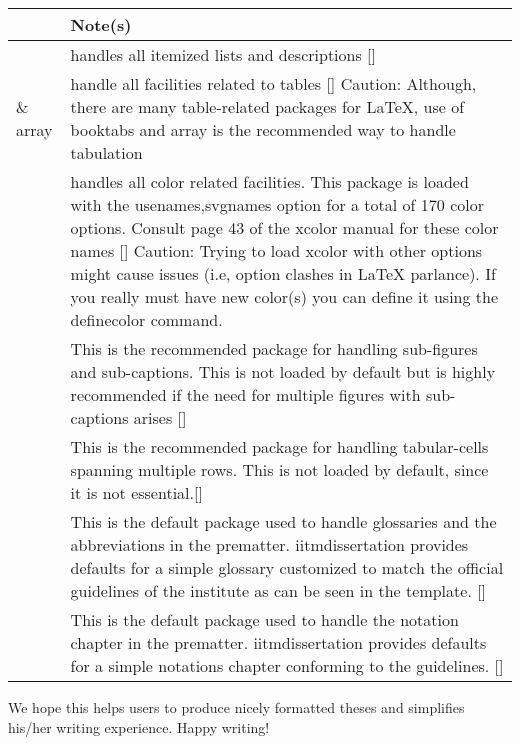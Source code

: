 \begin{table}
\centering
\begin{tabular}{>{\ttfamily}l p{}}
\toprule
{\rmfamily Package(s)} & Note(s) \\
\midrule
{enumitem}
    &
handles all itemized lists and descriptions
[\cite{enumitem}] \\

{booktabs} \& {array}
    &
handle all facilities related to tables [\cite{booktabs,array}]
\newline
{Caution: } Although, there are many table-related packages for {\LaTeX},
use of {booktabs} and {array} is the recommended way to handle
tabulation \\

{xcolor}
    &
handles all color related facilities. This package is loaded with the
{usenames,svgnames} option for a total of 170 color options. Consult page
43 of the {xcolor} manual for these color names [\cite{xcolor}]
\newline
{Caution: } Trying to load {xcolor} with other options might cause
issues (i.e, option clashes in {\LaTeX} parlance). If you really must have new
color(s) you can define it using the {definecolor} command. \\

{subcaption}
    &
This is the recommended package for handling sub-figures and
sub-captions. This is not loaded by default but is highly recommended if the
need for multiple figures with sub-captions arises [\cite{subcaption}] \\

{multirow}
    &
This is the recommended package for handling tabular-cells spanning multiple
rows. This is not loaded by default, since it is not
essential.[\cite{multirow}] \\

{glossaries}
    &
This is the default package used to handle glossaries and the abbreviations in
the prematter. {\ttfamily iitmdissertation} provides defaults for a simple glossary
customized to match the official guidelines of the institute as can be seen in
the template. [\cite{glossaries}] \\

{nomencl}
    &
This is the default package used to handle the notation chapter in the
prematter. {\ttfamily iitmdissertation} provides defaults for a simple notations
chapter conforming to the guidelines. [\cite{nomencl}] \\
\bottomrule
\end{tabular}
\end{table}

We hope this helps users to produce nicely formatted theses and simplifies his/her 
writing experience. Happy writing!